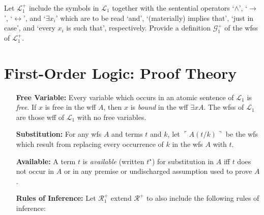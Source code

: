 \documentclass[a4paper, 11pt]{article} %
\newcommand{\corner}[1]{\ulcorner#1\urcorner} %
\begin{document}
Let $\mathcal{L}_1^+$ include the symbols in $\mathcal{L}_1$ together with the sentential operators `$\wedge$', `$\rightarrow$', `$\leftrightarrow$', and `$\exists x_i$' which are to be read `and', `(materially) implies that', `just in case', and `every $x_i$ is such that', respectively. Provide a definition $\mathcal{G}_1^+$ of the wfss of $\mathcal{L}_1^+$.




\section*{\sc First-Order Logic: Proof Theory}

\begin{enumerate}[leftmargin=1.2in,labelsep=.15in] %
\item[\bf Free Variable:] Every variable which occurs in an atomic sentence of $\mathcal{L}_1$ is \textit{free}. If $x$ is free in the wff $A$, then $x$ is \textit{bound} in the wff $\exists xA$. The wfss of $\mathcal{L}_1$ are those wff of $\mathcal{L}_1$ with no free variables.
\item[\bf Substitution:] For any wfs ${A}$ and terms $t$ and $k$, let $\corner{A(t/k)}$ be the wfs which result from replacing every occurrence of $k$ in the wfs ${A}$ with $t$.
\item[\bf Available:] A term $t$ is \textit{available} (written $t^\star$) for substitution in ${A}$ iff $t$ does not occur in ${A}$ or in any premise or undischarged assumption used to prove $A$.
\item[\bf Rules of Inference:] Let $\mathcal{R}_1^+$ extend $\mathcal{R}^+$ to also include the following rules of inference:%
\end{enumerate}
\end{document}
